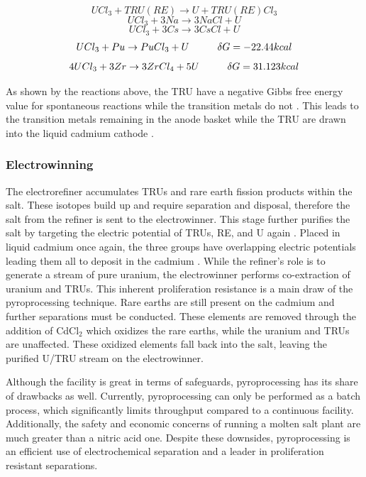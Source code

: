 \[ UCl_3+TRU(RE) \rightarrow U + TRU(RE)Cl_3 \]
\[ UCl_3 + 3Na \rightarrow 3NaCl + U \]
\[ UCl_3 + 3Cs \rightarrow 3CsCl + U \]
\[ UCl_3 + Pu \rightarrow PuCl_3 + U \hspace{10mm} \delta G = -22.44kcal \]
\[ 4UCl_3 + 3Zr \rightarrow 3ZrCl_4 + 5U \hspace{10mm} \delta G = 31.123kcal \]

As shown by the reactions above, the TRU have a negative Gibbs free energy value for spontaneous reactions while the transition metals do not \cite{phongikaroon_introduction_2015}.
This leads to the transition metals remaining in the anode basket while the TRU are drawn into the liquid cadmium cathode \cite{lee_korean_2011}.


\subsubsection{Electrowinning}
The electrorefiner accumulates TRUs and rare earth fission products within the salt.
These isotopes build up and require separation and disposal, therefore the salt from the refiner is sent to the electrowinner.
This stage further purifies the salt by targeting the electric potential of TRUs, RE, and U again \cite{lee_korean_2011,organisation}.
Placed in liquid cadmium once again, the three groups have overlapping electric potentials leading them all to deposit in the cadmium \cite{lee_korean_2011}. 
While the refiner's role is to generate a stream of pure uranium, the electrowinner performs co-extraction of uranium and TRUs.
This inherent proliferation resistance is a main draw of the pyroprocessing technique.
Rare earths are still present on the cadmium and further separations must be conducted.
These elements are removed through the addition of CdCl$_2$ which oxidizes the rare earths, while the uranium and TRUs are unaffected.
These oxidized elements fall back into the salt, leaving the purified U/TRU stream on the electrowinner.


Although the facility is great in terms of safeguards, pyroprocessing has its share of drawbacks as well.
Currently, pyroprocessing can only be performed as a batch process, which significantly limits throughput compared to a continuous facility. 
Additionally, the safety and economic concerns of running a molten salt plant are much greater than a nitric acid one.
Despite these downsides, pyroprocessing is an efficient use of electrochemical separation and a leader in proliferation resistant separations.

